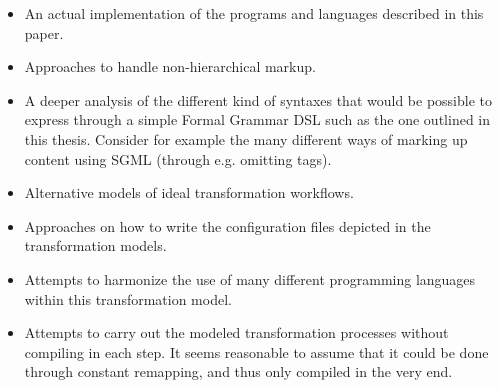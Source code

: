 \documentclass{scrreprt}
\begin{document}
\begin{itemize}
\item An actual implementation of the programs and languages described in this paper.
\item Approaches to handle non-hierarchical markup.
\item A deeper analysis of the different kind of syntaxes that would be possible to express through a simple Formal Grammar DSL such as the one outlined in this thesis. Consider for example the many different ways of marking up content using SGML (through e.g. omitting tags).
\item Alternative models of ideal transformation workflows.
\item Approaches on how to write the configuration files depicted in the transformation models.
\item Attempts to harmonize the use of many different programming languages within this transformation model.
\item Attempts to carry out the modeled transformation processes without compiling in each step. It seems reasonable to assume that it could be done through constant remapping, and thus only compiled in the very end.
\end{itemize}















%
%
%
%
%
%



\end{document}
